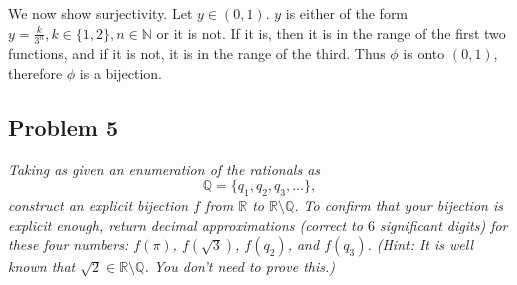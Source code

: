 \documentclass{article}
\newcommand{\N}{{\mathbb N}}
\newcommand{\Q}{{\mathbb Q}}
\newcommand{\R}{{\mathbb R}}
\begin{document}
We now show surjectivity.
Let $y \in (0,1)$.
$y$ is either of the form $y = \frac{k}{3^n}, k \in \{1,2\}, n\in\N$ or it is not.
If it is, then it is in the range of the first two functions,
and if it is not, it is in the range of the third.
Thus $\phi$ is onto $(0,1)$,
therefore $\phi$ is a bijection.
\clearpage

\subsection*{Problem 5}
{\it Taking as given an enumeration of the rationals as
\[\Q = \{q_1, q_2, q_3, \dots \},\]
construct an explicit bijection $f$ from $\R$ to $\R \setminus \Q$.
To confirm that your bijection is explicit enough,
return decimal approximations (correct to $6$ significant digits)
for these four numbers: $f(\pi)$, $f(\sqrt{3})$, $f(q_2)$, and $f(q_3)$.
(Hint: It is well known that $\sqrt{2} \in \R\setminus\Q$. You don't need to prove this.)
}
\end{document}
